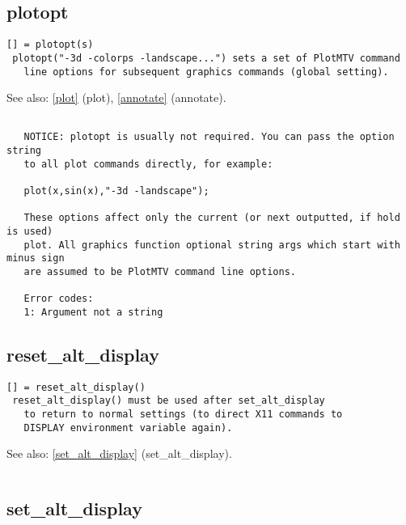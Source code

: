 \documentclass[a4paper]{article}
\begin{document}
\subsection{plotopt\label{plotopt}}

\begin{tscreen}
\begin{verbatim}
[] = plotopt(s)
 plotopt("-3d -colorps -landscape...") sets a set of PlotMTV command
   line options for subsequent graphics commands (global setting).
\end{verbatim}

See also: \ref{plot} {(plot)}, \ref{annotate} {(annotate)}.
\begin{verbatim}

   NOTICE: plotopt is usually not required. You can pass the option string
   to all plot commands directly, for example:

   plot(x,sin(x),"-3d -landscape");

   These options affect only the current (or next outputted, if hold is used)
   plot. All graphics function optional string args which start with minus sign
   are assumed to be PlotMTV command line options.
   
   Error codes:
   1: Argument not a string 
\end{verbatim}
\end{tscreen}



\subsection{reset\_alt\_display\label{reset_alt_display}}

\begin{tscreen}
\begin{verbatim}
[] = reset_alt_display()
 reset_alt_display() must be used after set_alt_display
   to return to normal settings (to direct X11 commands to
   DISPLAY environment variable again).
\end{verbatim}

See also: \ref{set_alt_display} {(set\_alt\_display)}.
\begin{verbatim}
\end{verbatim}
\end{tscreen}



\subsection{set\_alt\_display\label{set_alt_display}}
\end{document}
